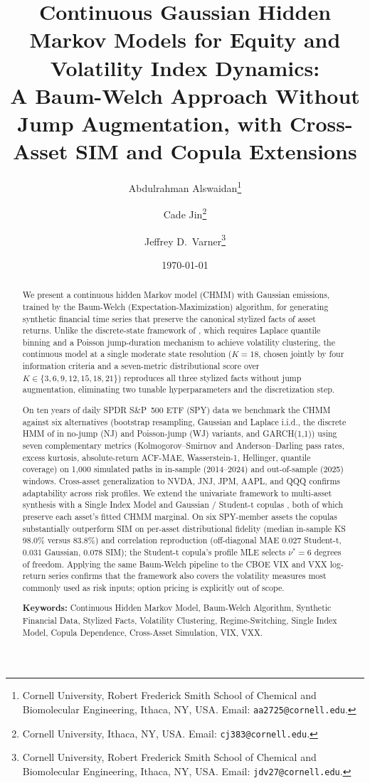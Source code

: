 \documentclass[11pt,a4paper]{article}
\title{Continuous Gaussian Hidden Markov Models for Equity and Volatility Index Dynamics:\\A Baum-Welch Approach Without Jump Augmentation, with Cross-Asset SIM and Copula Extensions}
\author{
    Abdulrahman Alswaidan\thanks{Cornell University, Robert Frederick Smith School of Chemical and Biomolecular Engineering, Ithaca, NY, USA. Email: \texttt{aa2725@cornell.edu}.}
    \and
    Cade Jin\thanks{Cornell University, Ithaca, NY, USA. Email: \texttt{cj383@cornell.edu}.}
    \and
    Jeffrey D.\ Varner\thanks{Cornell University, Robert Frederick Smith School of Chemical and Biomolecular Engineering, Ithaca, NY, USA. Email: \texttt{jdv27@cornell.edu}.}
}
\date{\today}
\begin{document}
\maketitle

\begin{abstract}
We present a continuous hidden Markov model (CHMM) with Gaussian emissions, trained by the Baum-Welch (Expectation-Maximization) algorithm, for generating synthetic financial time series that preserve the canonical stylized facts of asset returns.
Unlike the discrete-state framework of \citet{alswaidan2026hybrid}, which requires Laplace quantile binning and a Poisson jump-duration mechanism to achieve volatility clustering, the continuous model at a single moderate state resolution ($K = 18$, chosen jointly by four information criteria \citep{nguyen2018hidden} and a seven-metric distributional score over $K \in \{3, 6, 9, 12, 15, 18, 21\}$) reproduces all three stylized facts without jump augmentation, eliminating two tunable hyperparameters and the discretization step.

On ten years of daily SPDR S\&P~500 ETF (SPY) data we benchmark the CHMM against six alternatives (bootstrap resampling, Gaussian and Laplace i.i.d., the discrete HMM of \citet{alswaidan2026hybrid} in no-jump (NJ) and Poisson-jump (WJ) variants, and GARCH(1,1)) using seven complementary metrics (Kolmogorov--Smirnov and Anderson--Darling pass rates, excess kurtosis, absolute-return ACF-MAE, Wasserstein-1, Hellinger, quantile coverage) on 1{,}000 simulated paths in in-sample (2014--2024) and out-of-sample (2025) windows.
Cross-asset generalization to NVDA, JNJ, JPM, AAPL, and QQQ confirms adaptability across risk profiles.
We extend the univariate framework to multi-asset synthesis with a Single Index Model \citep{sharpe1963simplified} and Gaussian / Student-t copulas \citep{sklar1959fonctions, demarta2005tcopula}, both of which preserve each asset's fitted CHMM marginal.
On six SPY-member assets the copulas substantially outperform SIM on per-asset distributional fidelity (median in-sample KS 98.0\% versus 83.8\%) and correlation reproduction (off-diagonal MAE 0.027 Student-t, 0.031 Gaussian, 0.078 SIM); the Student-t copula's profile MLE selects $\nu^{*} = 6$ degrees of freedom.
Applying the same Baum-Welch pipeline to the CBOE VIX and VXX log-return series confirms that the framework also covers the volatility measures most commonly used as risk inputs; option pricing is explicitly out of scope.

\bigskip\noindent
\textbf{Keywords:} Continuous Hidden Markov Model, Baum-Welch Algorithm, Synthetic Financial Data, Stylized Facts, Volatility Clustering, Regime-Switching, Single Index Model, Copula Dependence, Cross-Asset Simulation, VIX, VXX.
\end{abstract}
\end{document}
